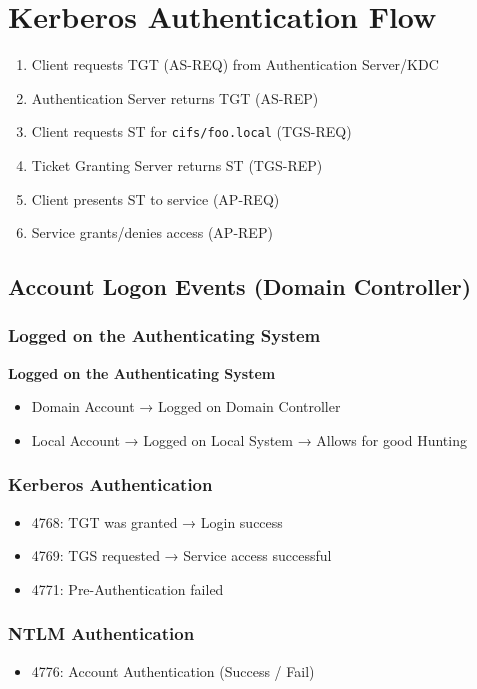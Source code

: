 \section*{Kerberos Authentication Flow}
\begin{enumerate}
\item Client requests TGT (AS-REQ) from Authentication Server/KDC
\item Authentication Server returns TGT (AS-REP)
\item Client requests ST for \texttt{cifs/foo.local} (TGS-REQ)
\item Ticket Granting Server returns ST (TGS-REP)
\item Client presents ST to service (AP-REQ)
\item Service grants/denies access (AP-REP)
\end{enumerate}

\subsection*{Account Logon Events (Domain Controller)}
\subsubsection*{Logged on the Authenticating System}
\textbf{Logged on the Authenticating System}
\begin{itemize}
    \item Domain Account → Logged on Domain Controller
    \item Local Account → Logged on Local System → Allows for good Hunting
\end{itemize}

\subsubsection*{Kerberos Authentication}
\begin{itemize}
    \item 4768: TGT was granted → Login success
    \item 4769: TGS requested → Service access successful 
    \item 4771: Pre-Authentication failed
\end{itemize}

\subsubsection*{NTLM Authentication}
\begin{itemize}
    \item 4776: Account Authentication (Success / Fail)
\end{itemize}


